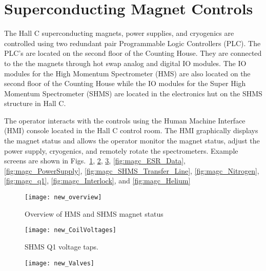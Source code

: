 \section{Superconducting Magnet Controls}
\label{sec:spectrometercontrols}

The Hall C superconducting magnets, power supplies, and cryogenics are
controlled using two redundant pair Programmable Logic Controllers
(PLC). The PLC's are located on the second floor of the Counting
House. They are connected to the the magnets through hot swap analog
and digital IO modules. The IO modules for the High Momentum
Spectrometer (HMS) are also located on the second floor of the
Counting House while the IO modules for the Super High Momentum
Spectrometer (SHMS) are located in the electronics hut on the SHMS
structure in Hall C.

The operator interacts with the controls using the Human Machine
Interface (HMI) console located in the Hall C control room. The HMI
graphically displays the magnet status and allows the operator monitor
the magnet status, adjust the power supply, cryogenics, and remotely
rotate the spectrometers.  Example screens are shown in
Figs.~\ref{fig:magc_overview}, \ref{fig:magc_coilvoltages},
\ref{fig:magc_valves}, \ref{fig:magc_ESR_Data},
\ref{fig:magc_PowerSupply}, \ref{fig:magc_SHMS_Transfer_Line},
\ref{fig:magc_Nitrogen}, \ref{fig:magc_q1}, \ref{fig:magc_Interlock},
and \ref{fig:magc_Helium}


\begin{figure}
\begin{center}
\texttt{[image: new\_overview]}
\caption{\label{fig:magc_overview}Overview of HMS and SHMS magnet status}
\end{center}
\end{figure}

\begin{figure}
\begin{center}
\texttt{[image: new\_CoilVoltages]}
\caption{\label{fig:magc_coilvoltages}SHMS Q1 voltage taps.}
\end{center}
\end{figure}


\begin{figure}
\begin{center}
\texttt{[image: new\_Valves]}
\caption{\label{fig:magc_valves}}
\end{center}
\end{figure}


